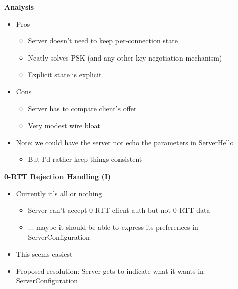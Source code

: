 \documentclass[helvetica]{seminar}
\newcommand{\heading}[1]{%
  \begin{center} 
    \large\bf 
    #1 
  \end{center} 
  \vspace{.4 in}}
\begin{document}
\begin{slide}
\heading{Analysis}

\begin{itemize}
\item Pros
  \begin{itemize}
  \item Server doesn't need to keep per-connection state
  \item Neatly solves PSK (and any other key negotiation mechanism)
  \item Explicit state is explicit
  \end{itemize}
\item Cons
  \begin{itemize}
  \item Server has to compare client's offer
  \item Very modest wire bloat
  \end{itemize}

\item Note: we could have the server not echo the parameters in ServerHello
  \begin{itemize}
  \item But I'd rather keep things consistent
  \end{itemize}
\end{itemize}
\end{slide}


\begin{slide}
\heading{0-RTT Rejection Handling (I)}

\begin{itemize}
\item Currently it's all or nothing
  \begin{itemize}
  \item Server can't accept 0-RTT client auth but not 0-RTT data
  \item ... maybe it should be able to express its preferences in ServerConfiguration
  \end{itemize}

\item This seems easiest
\item Proposed resolution: Server gets to indicate what it wants in ServerConfiguration
\end{itemize}
\end{slide}
\end{document}
